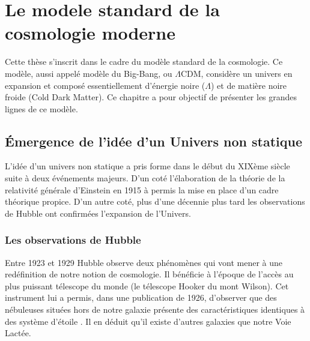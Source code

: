
\chapter{Le modele standard de la cosmologie moderne}
 \label{ch:introduction_physique}

Cette thèse s'inscrit dans le cadre du modèle standard de la cosmologie.
Ce modèle, aussi appelé modèle du Big-Bang, ou $\Lambda$CDM, considère un univers en expansion et composé essentiellement d'énergie noire ($\Lambda$) et de matière noire froide (Cold Dark Matter). 
Ce chapitre a pour objectif de présenter les grandes lignes de ce modèle.

\section{Émergence de l'idée d'un Univers non statique}



L'idée d'un univers non statique a pris forme dans le début du XIXème siècle suite à deux événements majeurs.
D'un coté l'élaboration de la théorie de la relativité générale d'Einstein en 1915 à permis la mise en place d'un cadre théorique propice.
D'un autre coté, plus d'une décennie plus tard les observations de Hubble ont confirmées l'expansion de l'Univers.

\subsection{Les observations de Hubble}

Entre 1923 et 1929 Hubble observe deux phénomènes qui vont mener à une redéfinition de notre notion de cosmologie.
Il bénéficie à l'époque de l'accès au plus puissant télescope du monde (le télescope Hooker du mont Wilson).
Cet instrument lui a permis, dans une publication de 1926, d'observer que des nébuleuses situées hors de notre galaxie présente des caractéristiques identiques à des système d'étoile \citep{1926ApJ....63..236H}.
Il en déduit qu'il existe d'autres galaxies que notre Voie Lactée.

